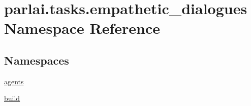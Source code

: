 \hypertarget{namespaceparlai_1_1tasks_1_1empathetic__dialogues}{}\section{parlai.\+tasks.\+empathetic\+\_\+dialogues Namespace Reference}
\label{namespaceparlai_1_1tasks_1_1empathetic__dialogues}
\subsection*{Namespaces}
\begin{DoxyCompactItemize}
\item 
 \hyperlink{namespaceparlai_1_1tasks_1_1empathetic__dialogues_1_1agents}{agents}
\item 
 \hyperlink{namespaceparlai_1_1tasks_1_1empathetic__dialogues_1_1build}{build}
\end{DoxyCompactItemize}
